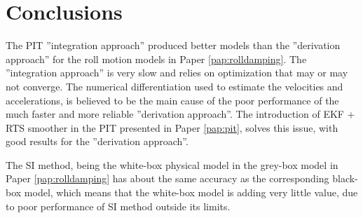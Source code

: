 \chapter{Conclusions\label{ch:conclusions}}
The PIT ''integration approach'' produced better models than the ''derivation approach'' for the roll motion models in Paper \ref{pap:rolldamping}. The ''integration approach'' is very slow and relies on optimization that may or may not converge.
The numerical differentiation used to estimate the velocities and accelerations, is believed to be the main cause of the poor performance of the much faster and more reliable ''derivation approach''. The introduction of EKF + RTS smoother in the PIT presented in Paper \ref{pap:pit}, solves this issue, with good results for the ''derivation approach''.

The SI method, being the white-box physical model in the grey-box model in Paper \ref{pap:rolldamping} has about the same accuracy as the corresponding black-box model, which means that the white-box model is adding very little value, due to poor performance of SI method outside its limits.

 

   